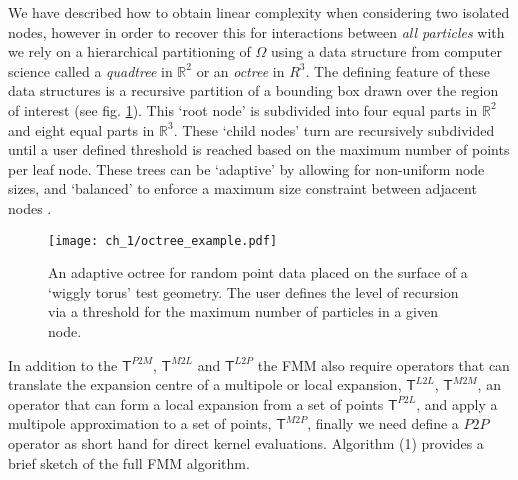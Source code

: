 We have described how to obtain linear complexity when considering two isolated nodes, however in order to recover this for interactions between \textit{all particles} with we rely on a hierarchical partitioning of $\Omega$ using a data structure from computer science called a \textit{quadtree} in $\mathbb{R}^2$ or an \textit{octree} in $\textit{R}^3$. The defining feature of these data structures is a recursive partition of a bounding box drawn over the region of interest (see fig. \ref{fig:octree_example:sec_1_2}). This ‘root node’ is subdivided into four equal parts in $\mathbb{R}^2$ and eight equal parts in $\mathbb{R}^3$. These ‘child nodes’ turn are recursively subdivided until a user defined threshold is reached based on the maximum number of points per leaf node. These trees can be `adaptive' by allowing for non-uniform node sizes, and `balanced' to enforce a maximum size constraint between adjacent nodes \cite{sundar2008bottom}.


\begin{figure}
    \centering
    \texttt{[image: ch\_1/octree\_example.pdf]}
    \caption{An adaptive octree for random point data placed on the surface of a `wiggly torus' test geometry. The user defines the level of recursion via a threshold for the maximum number of particles in a given node.}
    \label{fig:octree_example:sec_1_2}
\end{figure}

In addition to the $\mathsf{T}^{P2M}$, $\mathsf{T}^{M2L}$ and $\mathsf{T}^{L2P}$ the FMM also require operators that can translate the expansion centre of a multipole or local expansion, $\mathsf{T}^{L2L}$, $\mathsf{T}^{M2M}$, an operator that can form a local expansion from a set of points $\mathsf{T}^{P2L}$, and apply a multipole approximation to a set of points, $\mathsf{T}^{M2P}$, finally we need define a $P2P$ operator as short hand for direct kernel evaluations. Algorithm (1) provides a brief sketch of the full FMM algorithm.

